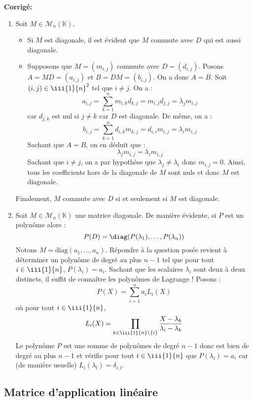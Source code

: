 \documentclass[a4paper,twoside,french,11pt]{VcCours}
\newcommand{\corr}{\textbf{Corrigé:}}
\begin{document}
\corr \begin{enumerate}
\item Soit $M \in \mathcal{M}_n(\mathbb{K})$. 
\begin{itemize}
\item Si $M$ est diagonale, il est évident que $M$ commute avec $D$ qui est aussi diagonale.
\item Supposons que $M=(m_{i,j})$ commute avec $D=(d_{i,j})$. Posons $A=MD=(a_{i,j})$ et $B=DM=(b_{i,j})$. On a donc $A=B$. Soit $(i,j) \in \iii{1}{n}^2$ tel que $i \neq j$. On a :
$$ a_{i,j} = \sum_{k=1}^n m_{i,k} d_{k,j} = m_{i,j} d_{j,j} = \lambda_j m_{i,j}$$
car $d_{j,k}$ est nul si $j \neq k$ car $D$ est diagonale.
De même, on a :
$$ b_{i,j} = \sum_{k=1}^n d_{i,k} m_{k,j} = d_{i,i}m_{i,j} = \lambda_i m_{i,j}$$
Sachant que $A=B$, on en déduit que :
$$ \lambda_j m_{i,j} = \lambda_i m_{i,j}$$
Sachant que $i \neq j$, on a par hypothèse que $\lambda_j \neq \lambda_i$ donc $m_{i,j}=0$. Ainsi, tous les coefficients hors de la diagonale de $M$ sont nuls et donc $M$ est diagonale.
\end{itemize}
Finalement, $M$ commute avec $D$ si et seulement si $M$ est diagonale.
\item Soit $M \in \mathcal{M}_n(\mathbb{K})$ une matrice diagonale. De manière évidente, si $P$ est un polynôme alors :
$$ P(D) = \diag(P(\lambda_1), \ldots, P(\lambda_n))$$
Notons $M= \textrm{diag}(a_1, \ldots, a_n)$. Répondre à la question posée revient à déterminer un polynôme de degré au plus $n-1$ tel que pour tout $i \in \iii{1}{n}$, $P(\lambda_i)= a_i$. Sachant que les scalaires $\lambda_i$ sont deux à deux distincts, il suffit de connaître les polynômes de Lagrange ! Posons :
$$ P(X) = \sum_{i=1}^n a_i L_i(X)$$
où pour tout $i \in \iii{1}{n}$,
$$ L_i(X) = \prod_{k \in \iii{1}{n} \setminus \lbrace i \rbrace} \dfrac{X-\lambda_k}{\lambda_i- \lambda_k}$$
Le polynôme $P$ est une somme de polynômes de degré $n-1$ donc est bien de degré au plus $n-1$ et vérifie pour tout $i \in \iii{1}{n}$ que $P(\lambda_i)= a_i$ car (de manière usuelle) $L_i(\lambda_t) = \delta_{i,t}$.

\end{enumerate}


\subsection{\large Matrice d'application linéaire}
\end{document}
